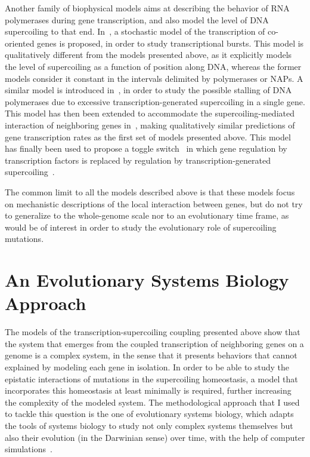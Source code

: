 Another family of biophysical models aims at describing the behavior of RNA polymerases during gene transcription, and also model the level of DNA supercoiling to that end.
In~\cite{brackley2016}, a stochastic model of the transcription of co-oriented genes is proposed, in order to study transcriptional bursts.
This model is qualitatively different from the models presented above, as it explicitly models the level of supercoiling as a function of position along DNA, whereas the former models consider it constant in the intervals delimited by polymerases or NAPs.
A similar model is introduced in~\cite{sevier2017}, in order to study the possible stalling of DNA polymerases due to excessive transcription-generated supercoiling in a single gene.
This model has then been extended to accommodate the supercoiling-mediated interaction of neighboring genes in~\cite{sevier2018}, making qualitatively similar predictions of gene transcription rates as the first set of models presented above.
This model has finally been used to propose a toggle switch~\citep{gardner2000} in which gene regulation by transcription factors is replaced by regulation by transcription-generated supercoiling~\citep{sevier2021}.

The common limit to all the models described above is that these models focus on mechanistic descriptions of the local interaction between genes, but do not try to generalize to the whole-genome scale nor to an evolutionary time frame, as would be of interest in order to study the evolutionary role of supercoiling mutations.


\section{An Evolutionary Systems Biology Approach}

The models of the transcription-supercoiling coupling presented above show that the system that emerges from the coupled transcription of neighboring genes on a genome is a complex system, in the sense that it presents behaviors that cannot explained by modeling each gene in isolation.
In order to be able to study the epistatic interactions of mutations in the supercoiling homeostasis, a model that incorporates this homeostasis at least minimally is required, further increasing the complexity of the modeled system.
The methodological approach that I used to tackle this question is the one of evolutionary systems biology, which adapts the tools of systems biology to study not only complex systems themselves but also their evolution (in the Darwinian sense) over time, with the help of computer simulations~\citep{beslon2021}.

